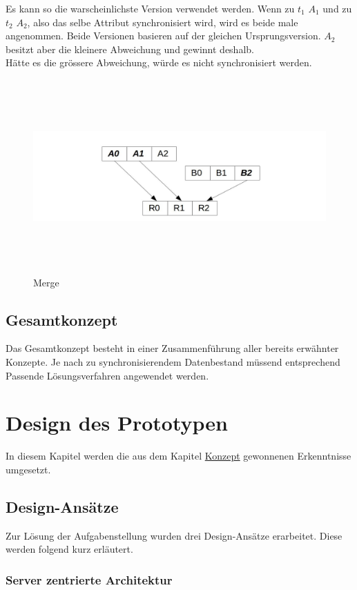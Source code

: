 \documentclass[oneside,11pt,parskip=half,ngerman]{scrreprt}
\makeatletter
\def\maxwidth{\ifdim\Gin@nat@width>\linewidth\linewidth
\else\Gin@nat@width\fi}
\let\Oldincludegraphics\includegraphics
\renewcommand{\includegraphics}[1]{\Oldincludegraphics[width=\maxwidth,height=20em,keepaspectratio]{#1}}
\makeatother
\begin{document}
Es kann so die warscheinlichste Version verwendet werden. Wenn zu
\(t_1\) \(A_1\) und zu \(t_2\) \(A_2\), also das selbe Attribut
synchronisiert wird, wird es beide male angenommen. Beide Versionen
basieren auf der gleichen Ursprungsversion. \(A_2\) besitzt aber die
kleinere Abweichung und gewinnt deshalb.\\Hätte es die grössere
Abweichung, würde es nicht synchronisiert werden.

\begin{figure}[htbp]
\centering
\includegraphics{./img/merge.jpg}
\caption{Merge}
\end{figure}

\newpage

\section{Gesamtkonzept}\label{gesamtkonzept}

Das Gesamtkonzept besteht in einer Zusammenführung aller bereits
erwähnter Konzepte. Je nach zu synchronisierendem Datenbestand müssend
entsprechend Passende Lösungsverfahren angewendet werden.

\chapter{Design des Prototypen}\label{design-des-prototypen}

In diesem Kapitel werden die aus dem Kapitel \hyperref[konzept]{Konzept}
gewonnenen Erkenntnisse umgesetzt.

\section{Design-Ansätze}\label{design-ansuxe4tze}

Zur Lösung der Aufgabenstellung wurden drei Design-Ansätze erarbeitet.
Diese werden folgend kurz erläutert.

\subsection{Server zentrierte
Architektur}\label{server-zentrierte-architektur}
\end{document}
